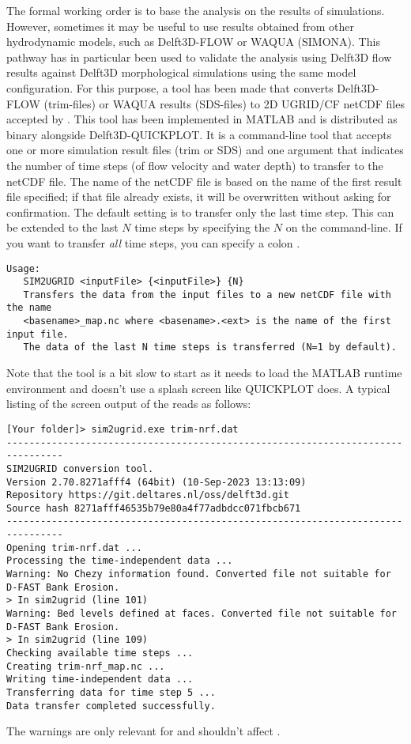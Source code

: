 The formal working order is to base the \dfastmi analysis on the results of \dflowfm simulations.
However, sometimes it may be useful to use results obtained from other hydrodynamic models, such as Delft3D-FLOW or WAQUA (SIMONA).
This pathway has in particular been used to validate the \dfmi analysis using Delft3D flow results against Delft3D morphological simulations using the same model configuration.
For this purpose, a tool  has been made that converts Delft3D-FLOW (trim-files) or WAQUA results (SDS-files) to 2D UGRID/CF netCDF files accepted by \dfmi.
This tool has been implemented in MATLAB and is distributed as binary alongside Delft3D-QUICKPLOT.
It is a command-line tool that accepts one or more simulation result files (trim or SDS) and one argument that indicates the number of time steps (of flow velocity and water depth) to transfer to the netCDF file.
The name of the netCDF file is based on the name of the first result file specified; if that file already exists, it will be overwritten without asking for confirmation.
The default setting is to transfer only the last time step.
This can be extended to the last $N$ time steps by specifying the $N$ on the command-line.
If you want to transfer \emph{all} time steps, you can specify a colon \keyw{:}.

\begin{Verbatim}
Usage:
   SIM2UGRID <inputFile> {<inputFile>} {N}
   Transfers the data from the input files to a new netCDF file with the name
   <basename>_map.nc where <basename>.<ext> is the name of the first input file.
   The data of the last N time steps is transferred (N=1 by default).
\end{Verbatim}

Note that the tool is a bit slow to start as it needs to load the MATLAB runtime environment and doesn't use a splash screen like QUICKPLOT does.
A typical listing of the screen output of the  reads as follows:

\begin{Verbatim}
[Your folder]> sim2ugrid.exe trim-nrf.dat
--------------------------------------------------------------------------------
SIM2UGRID conversion tool.
Version 2.70.8271afff4 (64bit) (10-Sep-2023 13:13:09)
Repository https://git.deltares.nl/oss/delft3d.git
Source hash 8271afff46535b79e80a4f77adbdcc071fbcb671
--------------------------------------------------------------------------------
Opening trim-nrf.dat ...
Processing the time-independent data ...
Warning: No Chezy information found. Converted file not suitable for D-FAST Bank Erosion.
> In sim2ugrid (line 101)
Warning: Bed levels defined at faces. Converted file not suitable for D-FAST Bank Erosion.
> In sim2ugrid (line 109)
Checking available time steps ...
Creating trim-nrf_map.nc ...
Writing time-independent data ...
Transferring data for time step 5 ...
Data transfer completed successfully.
\end{Verbatim}

The warnings are only relevant for \dfastbe and shouldn't affect \dfastmi.
